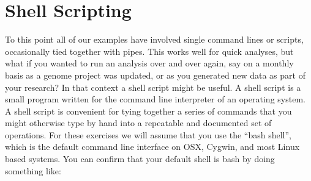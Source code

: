 \section{Shell Scripting}

To this point all of our examples have involved single command lines or scripts, occasionally tied together with pipes. This works well for quick analyses, but what if you wanted to run an analysis over and over again, say on a monthly basis as a genome project was updated, or as you generated new data as part of your research?  In that context a shell script might be useful. A shell script is a small program written for the command line interpreter of an operating system.  A shell script is convenient for tying together a series of commands that you might otherwise type by hand into a repeatable and documented set of operations. For these exercises we will assume that you use the ``bash shell'', which is the default command line interface on OSX, Cygwin, and most Linux based systems. You can confirm that your default shell is bash by doing something like:
%


